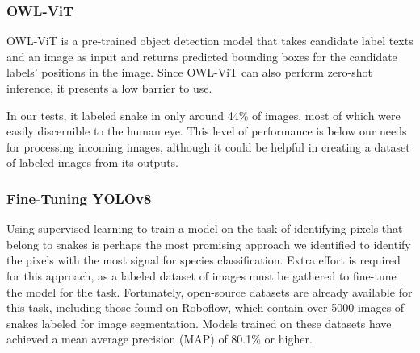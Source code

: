 \documentclass[]{ceurart}
\begin{document}
\subsubsection{OWL-ViT}

OWL-ViT \cite{minderer2022simple} is a pre-trained object detection model that takes candidate label texts and an image as input and returns predicted bounding boxes for the candidate labels' positions in the image. 
Since OWL-ViT can also perform zero-shot inference, it presents a low barrier to use.

In our tests, it labeled snake in only around 44\% of images, most of which were easily discernible to the human eye. 
This level of performance is below our needs for processing incoming images, although it could be helpful in creating a dataset of labeled images from its outputs. 

\subsubsection{Fine-Tuning YOLOv8}

Using supervised learning to train a model on the task of identifying pixels that belong to snakes is perhaps the most promising approach we identified to identify the pixels with the most signal for species classification.
Extra effort is required for this approach, as a labeled dataset of images must be gathered to fine-tune the model for the task. 
Fortunately, open-source datasets are already available for this task, including those found on Roboflow, which contain over 5000 images of snakes labeled for image segmentation. 
Models trained on these datasets have achieved a mean average precision (MAP) of 80.1\% \cite{roboflow-snake-dataset} or higher. 
\end{document}
